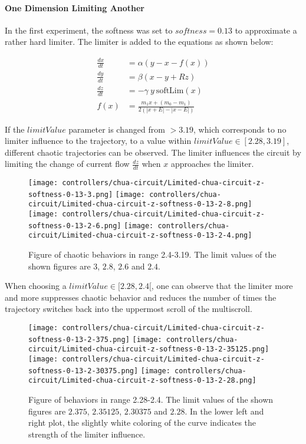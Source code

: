 \documentclass[main]{subfiles}
\begin{document}
\paragraph{One Dimension Limiting Another}

In the first experiment, the softness was set to \(softness=0.13\) to approximate a rather hard limiter. The limiter is added to the equations as shown below:

\begin{align*}
\frac{dx}{dt}&=\alpha (y-x-f(x)) \\
\frac{dy}{dt}&=\beta (x-y + Rz)\\
\frac{dz}{dt}&=-\gamma ~ y ~ \text{softLim}(x)\\
f (x) &= \frac{m_1 x + (m_0 - m_1)}{2 (| x + E | -| x - E |)}
\end{align*}

If the $limitValue$ parameter is changed from \(>3.19\), which corresponds to no limiter influence to the trajectory, to a value within \(limitValue \in [2.28,3.19]\), different chaotic trajectories can be observed. %
%
The limiter influences the circuit by limiting the change of current flow \(\frac{dz}{dt}\) when \(x\) approaches the limiter.

\begin{figure}[H]
\centering
\texttt{[image: controllers/chua-circuit/Limited-chua-circuit-z-softness-0-13-3.png]}
\texttt{[image: controllers/chua-circuit/Limited-chua-circuit-z-softness-0-13-2-8.png]}
\texttt{[image: controllers/chua-circuit/Limited-chua-circuit-z-softness-0-13-2-6.png]}
\texttt{[image: controllers/chua-circuit/Limited-chua-circuit-z-softness-0-13-2-4.png]}
\caption[Figure of chaotic behaviors in range 2.4-3.19]{Figure of chaotic behaviors in range 2.4-3.19. The limit values of the shown figures are \(3\), \(2.8\), \(2.6\) and \(2.4\).}
\label{figure:z-2.4-3.19-chaotictrajectories}
\end{figure}

When choosing a \(limitValue \in [2.28,2.4[\), one can observe that the limiter more and more suppresses chaotic behavior and reduces the number of times the trajectory switches back into the uppermost scroll of the multiscroll.

\begin{figure}[H]
\centering
\texttt{[image: controllers/chua-circuit/Limited-chua-circuit-z-softness-0-13-2-375.png]}
\texttt{[image: controllers/chua-circuit/Limited-chua-circuit-z-softness-0-13-2-35125.png]}
\texttt{[image: controllers/chua-circuit/Limited-chua-circuit-z-softness-0-13-2-30375.png]}
\texttt{[image: controllers/chua-circuit/Limited-chua-circuit-z-softness-0-13-2-28.png]}
\caption[Figure of behaviors in range 2.28-2.4]{Figure of behaviors in range 2.28-2.4. The limit values of the shown figures are \(2.375\), \(2.35125\), \(2.30375\) and \(2.28\). In the lower left and right plot, the slightly white coloring of the curve indicates the strength of the limiter influence.}
\label{figure:z-2.28-2.4-chaotictrajectories}
\end{figure}
\end{document}
